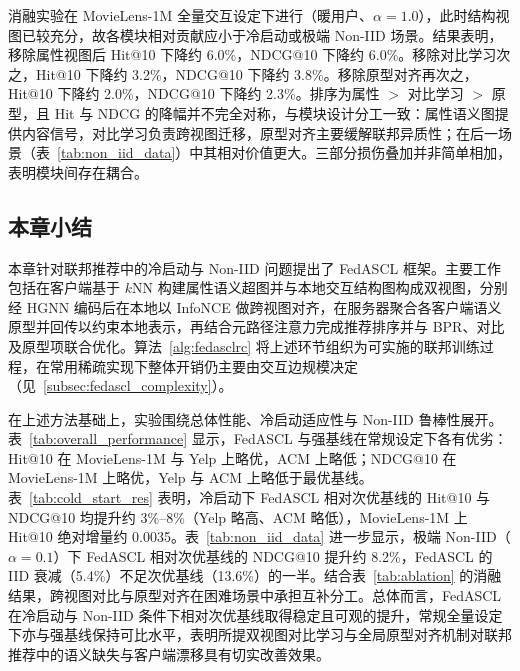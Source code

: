 消融实验在 MovieLens-1M 全量交互设定下进行（暖用户、$\alpha=1.0$），此时结构视图已较充分，故各模块相对贡献应小于冷启动或极端 Non-IID 场景。结果表明，移除属性视图后 Hit@10 下降约 6.0\%，NDCG@10 下降约 6.0\%。移除对比学习次之，Hit@10 下降约 3.2\%，NDCG@10 下降约 3.8\%。移除原型对齐再次之，Hit@10 下降约 2.0\%，NDCG@10 下降约 2.3\%。排序为属性 $>$ 对比学习 $>$ 原型，且 Hit 与 NDCG 的降幅并不完全对称，与模块设计分工一致：属性语义图提供内容信号，对比学习负责跨视图迁移，原型对齐主要缓解联邦异质性；在后一场景（表~\ref{tab:non_iid_data}）中其相对价值更大。三部分损伤叠加并非简单相加，表明模块间存在耦合。

\subsection{本章小结}
本章针对联邦推荐中的冷启动与 Non-IID 问题提出了 FedASCL 框架。主要工作包括在客户端基于 $k$NN 构建属性语义超图并与本地交互结构图构成双视图，分别经 HGNN 编码后在本地以 InfoNCE 做跨视图对齐，在服务器聚合各客户端语义原型并回传以约束本地表示，再结合元路径注意力完成推荐排序并与 BPR、对比及原型项联合优化。算法~\ref{alg:fedasclrc} 将上述环节组织为可实施的联邦训练过程，在常用稀疏实现下整体开销仍主要由交互边规模决定（见~\ref{subsec:fedascl_complexity}）。

在上述方法基础上，实验围绕总体性能、冷启动适应性与 Non-IID 鲁棒性展开。表~\ref{tab:overall_performance} 显示，FedASCL 与强基线在常规设定下各有优劣：Hit@10 在 MovieLens-1M 与 Yelp 上略优，ACM 上略低；NDCG@10 在 MovieLens-1M 上略优，Yelp 与 ACM 上略低于最优基线。表~\ref{tab:cold_start_res} 表明，冷启动下 FedASCL 相对次优基线的 Hit@10 与 NDCG@10 均提升约 3\%--8\%（Yelp 略高、ACM 略低），MovieLens-1M 上 Hit@10 绝对增量约 0.0035。表~\ref{tab:non_iid_data} 进一步显示，极端 Non-IID（$\alpha=0.1$）下 FedASCL 相对次优基线的 NDCG@10 提升约 8.2\%，FedASCL 的 IID 衰减（5.4\%）不足次优基线（13.6\%）的一半。结合表~\ref{tab:ablation} 的消融结果，跨视图对比与原型对齐在困难场景中承担互补分工。总体而言，FedASCL 在冷启动与 Non-IID 条件下相对次优基线取得稳定且可观的提升，常规全量设定下亦与强基线保持可比水平，表明所提双视图对比学习与全局原型对齐机制对联邦推荐中的语义缺失与客户端漂移具有切实改善效果。